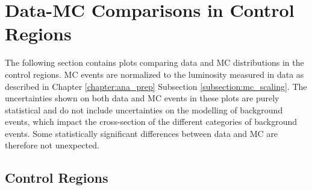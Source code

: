 \section{Data-MC Comparisons in Control Regions}
\label{section:datamc}
The following section contains plots comparing data and MC distributions in the control regions. MC events are normalized to the luminosity measured in data as described in Chapter \ref{chapter:ana_prep} Subsection \ref{subsection:mc_scaling}. The uncertainties shown on both data and MC events in these plots are purely statistical and do not include uncertainties on the modelling of background events, which impact the cross-section of the different categories of background events. Some statistically significant differences between data and MC are therefore not unexpected.
\subsection{\ttbar Control Regions}

